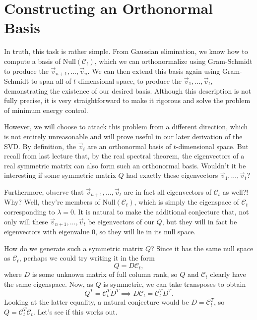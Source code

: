 \documentclass[letterpaper]{article}
\theoremstyle{remark}
\newcommand{\Null}[1]{\text{Null}(#1)}
\begin{document}
\section{Constructing an Orthonormal Basis}
In truth, this task is rather simple. From Gaussian elimination, we know how to compute a basis of $\Null{\mathscr{C}_t}$, which we can orthonormalize using Gram-Schmidt to produce the $\vec{v}_{n+1}, \ldots, \vec{v}_n$. We can then extend this basis again using Gram-Schmidt to span all of $t$-dimensional space, to produce the $\vec{v}_1, \ldots, \vec{v}_t$, demonstrating the existence of our desired basis. Although this description is not fully precise, it is very straightforward to make it rigorous and solve the problem of minimum energy control.

However, we will choose to attack this problem from a different direction, which is not entirely unreasonable and will prove useful in our later derivation of the SVD. By definition, the $\vec{v}_i$ are an orthonormal basis of $t$-dimensional space. But recall from last lecture that, by the real spectral theorem, the eigenvectors of a real symmetric matrix can also form such an orthonormal basis. Wouldn't it be interesting if some symmetric matrix $Q$ had exactly these eigenvectors $\vec{v}_1, \ldots, \vec{v}_t$?

Furthermore, observe that $\vec{v}_{n+1}, \ldots, \vec{v}_t$ are in fact all eigenvectors of $\mathscr{C}_t$ as well?! Why? Well, they're members of $\Null{\mathscr{C}_t}$, which is simply the eigenspace of $\mathscr{C}_t$ corresponding to $\lambda = 0$. It is natural to make the additional conjecture that, not only will these $\vec{v}_{n+1}, \ldots, \vec{v}_t$ be eigenvectors of our $Q$, but they will in fact be eigenvectors with eigenvalue $0$, so they will lie in its null space.

How do we generate such a symmetric matrix $Q$? Since it has the same null space as $\mathscr{C}_t$, perhaps we could try writing it in the form
\[
    Q = D\mathscr{C}_t,
\]
where $D$ is some unknown matrix of full column rank, so $Q$ and $\mathscr{C}_t$ clearly have the same eigenspace. Now, as $Q$ is symmetric, we can take transposes to obtain
\[
    Q^T = \mathscr{C}_t^TD^T \implies D\mathscr{C}_t = \mathscr{C}_t^TD^T.
\]
Looking at the latter equality, a natural conjecture would be $D = \mathscr{C}_t^T$, so $Q = \mathscr{C}_t^T\mathscr{C}_t$. Let's see if this works out.
\end{document}
